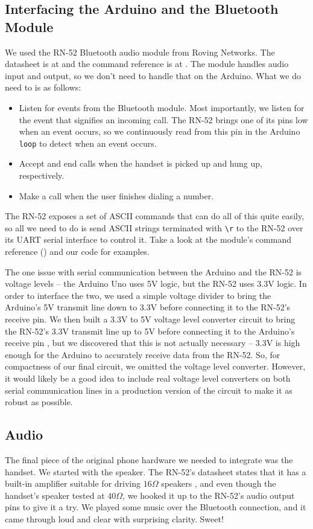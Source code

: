 \documentclass{es50report}
\begin{document}
    \subsection{Interfacing the Arduino and the Bluetooth Module}
    We used the RN-52 Bluetooth audio module from Roving Networks. The datasheet is at \cite{rn52Datasheet} and the command reference is at \cite{rn52CommandRef}. The module handles audio input and output, so we don't need to handle that on the Arduino. What we do need to is as follows:

    \begin{itemize}
        \item Listen for events from the Bluetooth module. Most importantly, we listen for the event that signifies an incoming call. The RN-52 brings one of its pins low when an event occurs, so we continuously read from this pin in the Arduino \verb+loop+ to detect when an event occurs.
        \item Accept and end calls when the handset is picked up and hung up, respectively.
        \item Make a call when the user finishes dialing a number.
    \end{itemize}

    The RN-52 exposes a set of ASCII commands that can do all of this quite easily, so all we need to do is send ASCII strings terminated with \verb+\r+ to the RN-52 over its UART serial interface to control it. Take a look at the module's command reference (\cite{rn52CommandRef}) and our code for examples.

    The one issue with serial communication between the Arduino and the RN-52 is voltage levels -- the Arduino Uno uses 5V logic, but the RN-52 uses 3.3V logic. In order to interface the two, we used a simple voltage divider to bring the Arduino's 5V transmit line down to 3.3V before connecting it to the RN-52's receive pin. We then built a 3.3V to 5V voltage level converter circuit to bring the RN-52's 3.3V transmit line up to 5V before connecting it to the Arduino's receive pin \cite{hobbytronics14}, but we discovered that this is not actually necessary -- 3.3V is high enough for the Arduino to accurately receive data from the RN-52. So, for compactness of our final circuit, we omitted the voltage level converter. However, it would likely be a good idea to include real voltage level converters on both serial communication lines in a production version of the circuit to make it as robust as possible.

    \subsection{Audio}
    The final piece of the original phone hardware we needed to integrate was the handset. We started with the speaker. The RN-52's datasheet states that it has a built-in amplifier suitable for driving $16\Omega$ speakers \cite{rn52Datasheet}, and even though the handset's speaker tested at $40\Omega$, we hooked it up to the RN-52's audio output pins to give it a try. We played some music over the Bluetooth connection, and it came through loud and clear with surprising clarity. Sweet!
\end{document}
